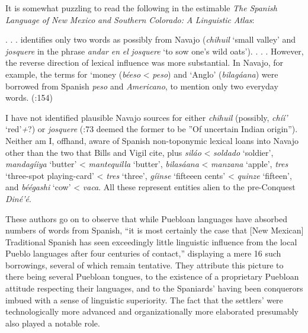 It is somewhat puzzling to read the following in the estimable \textit{The} \textit{Spanish} \textit{Language} \textit{of} \textit{New} \textit{Mexico} \textit{and} \textit{Southern} \textit{Colorado:} \textit{A} \textit{Linguistic} \textit{Atlas}: 

\citet{Cobos2003} . . . identifies only two words as possibly from Navajo (\textit{chihuil} ‘small valley’ and \textit{josquere} in the phrase \textit{andar} \textit{en} \textit{el} \textit{josquere} ‘to sow one’s wild oats’). . . .  However, the reverse direction of lexical influence was more substantial.  In Navajo, for example, the terms for ‘money (\textit{béeso} < \textit{peso}) and ‘Anglo’ (\textit{bilagáana}) were borrowed from Spanish \textit{peso} and \textit{Americano}, to mention only two everyday words.  (\citealt{BillsVigil2008}:154)

I have not identified plausible Navajo sources for either \textit{chihuil} (possibly, \textit{chíí’} ‘red’\textit{+}?) or \textit{josquere} (\citealt{Studerus2001}:73 deemed the former to be ”Of uncertain Indian origin”).  Neither am I, offhand, aware of Spanish non-toponymic lexical loans into Navajo other than the two that Bills and Vigil cite, plus \textit{siláo} < \textit{soldado} ‘soldier’, \textit{mandagíiya} ‘butter’ < \textit{mantequilla} ‘butter’, \textit{bilasáana} < \textit{manzana} ‘apple’, \textit{tres} ‘three-spot playing-card’ < \textit{tres} ‘three’, \textit{gíinse} ‘fifteeen cents’ < \textit{quinze} ‘fifteen’, and \textit{béégashi} ‘cow’ < \textit{vaca}.  All these represent entities alien to the pre-Conquest \textit{Diné’é}.

These authors go on to observe that while Puebloan languages have absorbed numbers of words from Spanish, “it is most certainly the case that [New Mexican] Traditional Spanish has seen exceedingly little linguistic influence from the local Pueblo languages after four centuries of contact,” displaying a mere 16 such borrowings, several of which remain tentative.  They attribute this picture to there being several Puebloan tongues, to the existence of a proprietary Puebloan attitude respecting their languages, and to the Spaniards’ having been conquerors imbued with a sense of linguistic superiority.  The fact that the settlers’ were technologically more advanced and organizationally more elaborated presumably also played a notable role.

